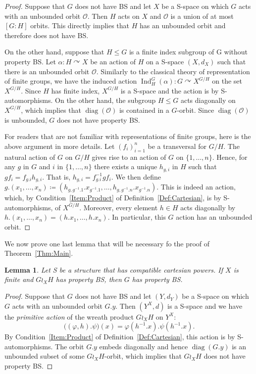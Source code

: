 \documentclass[a4paper]{article}
\newtheorem{lem}{Lemma}[section]
\theoremstyle{definition}
\DeclareMathOperator\Ind{Ind}
\DeclareMathOperator\diag{diag}
\newcommand*{\orbite}{\mathcal O}
\begin{document}
\begin{proof}
Suppose that $G$ does not have BS and let $X$ be a S-space on which $G$ acts with an unbounded orbit $\orbite$.
Then $H$ acts on $X$ and $\orbite$ is a union of at most $[G:H]$ orbits. This directly implies that $H$ has an unbounded orbit and therefore does not have BS.

On the other hand, suppose that $H\leq G$ is a finite index subgroup of G without property BS.
Let $\alpha\colon H\curvearrowright X$ be an action of $H$ on a S-space $(X,d_X)$ such that there is an unbounded orbit $\orbite$.
Similarly to the classical theory of representation of finite groups, we have the induced  action $\Ind_H^G(\alpha)\colon G \curvearrowright X^{G/H}$ on the set $X^{G/H}$. Since $H$ has finite index, $X^{G/H}$ is a S-space and the action is by S-automorphisms. On the other hand, the subgroup $H\leq G$ acts diagonally on $X^{G/H}$, which implies that $\diag(\orbite)$ is contained in a $G$-orbit.
Since $\diag(\orbite)$ is unbounded, $G$ does not have property BS.

For readers that are not familiar with representations of finite groups, here is the above argument in more details.
Let $(f_i)_{i=1}^n$ be a transversal for $G/H$.
The natural action of $G$ on $G/H$ gives rise to an action of $G$ on $\{1,\dots,n\}$.
Hence, for any $g$ in $G$ and $i$ in $\{1,\dots,n\}$ there exists a unique $h_{g,i}$ in $H$ such that $gf_i=f_{g.i}h_{g,i}$. That is, $h_{g,i}=f_{g.i}^{-1}gf_i$.
We then define $g.(x_1,\dots,x_n)\coloneqq(h_{g,g^{-1}.1}.x_{g^{-1}.1},\dots,h_{g,g^{-1}.n}.x_{g^{-1}.n})$. This is indeed an action, which, by Condition~\ref{Item:Product} of Definition~\ref{Def:Cartesian}, is by S-automorphisms, of $X^{G/H}$.
Moreover, every element $h\in H$ acts diagonally by $h.(x_1,\dots,x_n)=(h.x_1,\dots,h.x_n)$.
In particular, this $G$ action has an unbounded orbit.
\end{proof}
%
%
We now prove one last lemma that will be necessary fo the proof of Theorem~\ref{Thm:Main}.
%
%
\begin{lem}\label{Lemma:Unboundedness}
Let S be a structure that has compatible cartesian powers. If $X$ is finite and $G\wr_XH$ has property BS, then $G$ has property BS.
\end{lem}
\begin{proof}
Suppose that $G$ does not have BS and let $(Y,d_Y)$ be a S-space on which $G$ acts with an unbounded orbit $G.y$.
Then $(Y^X,d)$ is a S-space and we have the \emph{primitive action} of the wreath product $G\wr_XH$ on $Y^X$:
\[
	\bigl((\varphi,h).\psi\bigr)(x)=\varphi(h^{-1}.x).\psi(h^{-1}.x).
\]
By Condition~\ref{Item:Product} of Definition~\ref{Def:Cartesian}, this action is by S-automorphisms.
The orbit $G.y$ embeds diagonally and hence $\diag(G.y)$ is an unbounded subset of some $G\wr_XH$-orbit, which implies that $G\wr_XH$ does not have property BS.
\end{proof}
\end{document}
